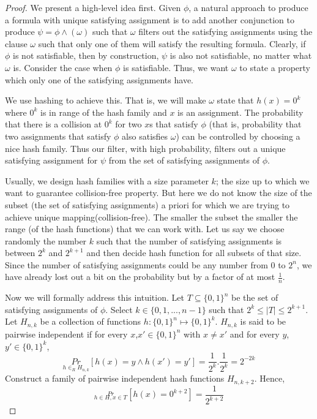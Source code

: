 \documentclass[11pt]{article}
\begin{document}
\begin{proof}
We present a high-level idea first. Given $\phi$, a natural approach to produce a formula with unique satisfying assignment is to add another conjunction to produce $\psi = \phi \land (\omega)$ such that $\omega$ 
filters out the satisfying assignments using the clause $\omega$ such that only one of them will satisfy the resulting formula. Clearly, if $\phi$ is not satisfiable, then by construction, $\psi$ is also not satisfiable, no matter what $\omega$ is. Consider the case when $\phi$ is satisfiable. Thus, we want $\omega$ to state a property which only one of the satisfying assignments have. 

We use hashing to achieve this. That is, we will make $\omega$ state that $h(x) = 0^k$ where $0^k$ is in range of the hash family and $x$ is an assignment. The probability that there is a collision at $0^k$ for two $x$s that satisfy $\phi$ (that is, probability that two assignments that satisfy $\phi$ also satisfies $\omega$) can be controlled by choosing a nice hash family. Thus our filter, with high probability, filters out a unique satisfying assignment for $\psi$ from the set of satisfying assignments of $\phi$.

Usually, we design hash families with a size parameter $k$; the size up to which we want to guarantee collision-free property. But here we do not know the size of the subset (the set of satisfying assignments) a priori for which we are trying to achieve unique mapping(collision-free). The smaller the subset the smaller the range (of the hash functions) that we can work with. Let us say we choose randomly the number $k$ such that the number of satisfying assignments is between $2^k$ and $2^{k+1}$ and then decide hash function for all subsets of that size. Since the number of satisfying assignments could be any number from $0$ to $2^n$, we have already lost out a bit on the probability but by a factor of at most $\frac{1}{n}$.

Now we will formally address this intuition.
Let $T \subseteq \{0,1\}^n$ be the set of satisfying assignments of $\phi$. Select $k \in \{0,1,...,n-1\}$ such that $2^k \leq |T| \leq 2^{k+1}$. Let $H_{n,k}$ be a collection of functions $h: \{0,1\}^n \mapsto \{0,1\}^k$. $H_{n,k}$ is said to be pairwise independent if for every $x$,$x' \in \{0,1\}^n$ with $x \neq x'$ and for every $y$,$y' \in \{0, 1\}^k$, 
\[ \underset{h \in_R H_{n,k}}{Pr}[h(x) = y \wedge h(x') =y'] = \frac{1}{2^k}.\frac{1}{2^k}=2^{ -2k}
\]
Construct a family of pairwise independent hash functions $H_{n,k+2}$. Hence, 
\[
\stackrel{Pr}{_{h \in H,x \in T}}[h(x)=0^{k+2}]=\frac{1}{2^{k+2}}
\]


\end{proof}
\end{document}
